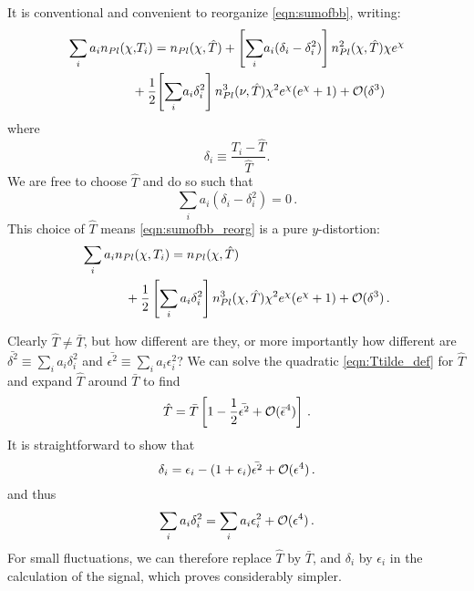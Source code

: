 \documentclass[fleqn,usenatbib]{mnras}
\begin{document}
    It is conventional and convenient to reorganize \autoref{eqn:sumofbb},
    writing:
    \begin{align} \label{eqn:sumofbb_reorg}
        \sum_i a_i n_{Pl}(\chi,\!T_i)
            &=   n_{Pl}(\chi,\hat{T})
               + \left[\sum_i \! a_i (\delta_i - \delta_i^2)\right] n_{Pl}^2(\chi,\hat{T}) \chi e^\chi \nonumber
            \\ &\!\!\!\!\!\!\!\!\!\!
               + \frac{1}{2}\!\left[\sum_i \! a_i \delta_i^2\right] n_{Pl}^3(\nu,\hat{T}) \chi^2
               e^\chi (e^\chi +1)
               + \mcal{O}(\delta^3)
    \end{align}
    where 
    \begin{equation}
        \delta_i\equiv\frac{T_i-\hat{T}}{\hat{T}}.
    \end{equation}
    We are free to choose $\hat{T}$ and do so such that  
    \begin{equation} \label{eqn:Ttilde_def}
        \sum_i a_i (\delta_i - \delta_i^2) = 0\,.
    \end{equation}
    This choice of $\hat{T}$ means \autoref{eqn:sumofbb_reorg} is a pure
    $y$-distortion:
    \begin{align}
        \sum_i a_i & n_{Pl}(\chi,T_i) =
            n_{Pl}(\chi,\hat{T}) \\ &\phantom{=} 
            + \frac{1}{2}\left[\sum_i a_i \delta_i^2\right]n_{Pl}^3(\chi,\hat{T}) \chi^2 e^\chi (e^\chi +1)
            + \mathcal{O}(\delta^3)\,. \nonumber
    \end{align}

    Clearly $\hat{T}\neq\bar{T}$, but how different are they, or more
    importantly how different are $\bar{\delta^2}\equiv\sum_i a_i \delta_i^2$
    and $\bar{\epsilon^2}\equiv\sum_i a_i \epsilon_i^2$? We can solve the
    quadratic  \autoref{eqn:Ttilde_def} for $\hat{T}$ and expand $\hat{T}$
    around $\bar{T}$ to find
    \begin{equation}
        \hat{T} = \bar{T} \left[
                  1
                - \frac{1}{2}\bar{\epsilon^2}
                + {\cal{O}}(\bar{\epsilon}^4)
            \right] \,.
    \end{equation}
    It is straightforward to show that
    \begin{equation}
        \delta_i = \epsilon_i - (1+\epsilon_i) \bar{\epsilon^2} + {\cal{O}}(\epsilon^4)\,.
    \end{equation}
    and thus
    \begin{equation}
        \sum_i a_i\delta_i^2 = \sum_i a_i\epsilon_i^2 + {\cal{O}}(\epsilon^4)\,.
    \end{equation}
    For small fluctuations, we can therefore replace $\hat{T}$ by $\bar{T}$, and
    $\delta_i$ by $\epsilon_i$ in the calculation of the signal, which proves
    considerably simpler.
\end{document}
